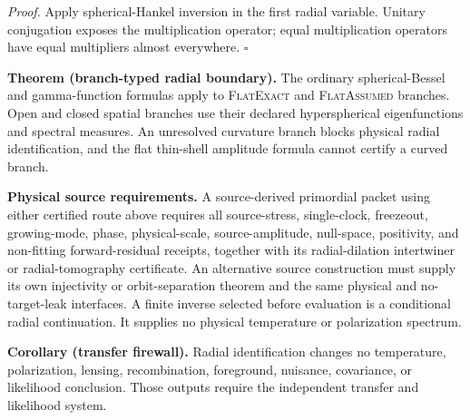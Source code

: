 \textit{Proof.}
Apply spherical-Hankel inversion in the first radial variable.  Unitary
conjugation exposes the multiplication operator; equal multiplication operators
have equal multipliers almost everywhere.  \hfill$\square$

\textbf{Theorem (branch-typed radial boundary).}
\label{thm:oph330-branch-typed-radial-boundary}
The ordinary spherical-Bessel and gamma-function formulas apply to
\textsc{FlatExact} and \textsc{FlatAssumed} branches. Open and closed spatial
branches use their declared hyperspherical eigenfunctions and spectral
measures. An unresolved curvature branch blocks physical radial
identification, and
the flat thin-shell amplitude formula cannot certify a curved branch.

\textbf{Physical source requirements.}
A source-derived primordial packet using either certified route above
requires all source-stress, single-clock, freezeout, growing-mode, phase,
physical-scale, source-amplitude, null-space, positivity, and non-fitting
forward-residual receipts, together with its radial-dilation intertwiner or
radial-tomography certificate. An alternative source construction must supply
its own injectivity or orbit-separation theorem and the same physical and
no-target-leak interfaces. A finite inverse selected before evaluation is a
conditional radial continuation. It supplies no physical temperature or
polarization spectrum.

\textbf{Corollary (transfer firewall).}
Radial identification changes no temperature, polarization, lensing,
recombination, foreground, nuisance, covariance, or likelihood conclusion.
Those outputs require the independent transfer and likelihood system.
